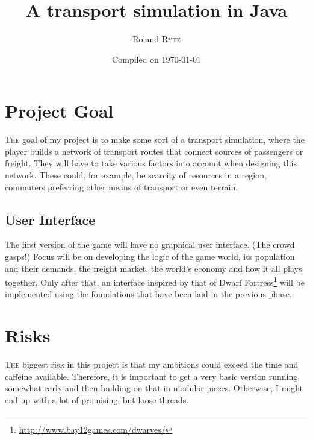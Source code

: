 \documentclass[a4paper]{article}
\title{
	\vspace{-10mm}
	\fontsize{18pt}{10pt}
	\selectfont\textbf{
		A transport simulation in Java
	}\\[-4mm]
}
\author{
	Roland \textsc{Rytz}
}
\date{Compiled on \today}
\begin{document}
\maketitle

\thispagestyle{fancy} %



\section{Project Goal}
\lettrine[findent=0.25em,nindent=-0em,slope=0mm,lines=2]{T}{he} goal of my project is to make some sort of a transport simulation, where the player builds a network of transport routes that connect sources of passengers or freight. They will have to take various factors into account when designing this network. These could, for example, be scarcity of resources in a region, commuters preferring other means of transport or even terrain.\\
\subsection{User Interface}
The first version of the game will have no graphical user interface. (The crowd gasps!) Focus will be on developing the logic of the game world, its population and their demands, the freight market, the world's economy and how it all plays together. Only after that, an interface inspired by that of Dwarf Fortress\footnote{\url{http://www.bay12games.com/dwarves/}} will be implemented using the foundations that have been laid in the previous phase.

\section{Risks}
\lettrine[findent=0.25em,nindent=-0em,slope=0mm,lines=2]{T}{he} biggest risk in this project is that my ambitions could exceed the time and caffeine available. Therefore, it is important to get a very basic version running somewhat early and then building on that in modular pieces. Otherwise, I might end up with a lot of promising, but loose threads.
\end{document}
